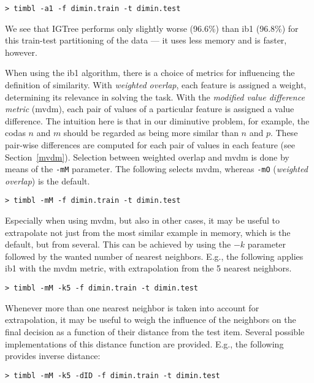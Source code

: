 \documentclass{book}
\begin{document}
{\footnotesize
\begin{verbatim}
> timbl -a1 -f dimin.train -t dimin.test
\end{verbatim}} 

We see that {\sc IGTree} performs only slightly worse (96.6\%) than
{\sc ib1} (96.8\%) for this train-test partitioning of the data --- it
uses less memory and is faster, however.

When using the {\sc ib1} algorithm, there is a choice of metrics for
influencing the definition of similarity. With {\em weighted overlap},
each feature is assigned a weight, determining its relevance in
solving the task. With the {\em modified value difference metric}
({\sc mvdm}), each pair of values of a particular feature is assigned
a value difference. The intuition here is that in our diminutive
problem, for example, the codas $n$ and $m$ should be regarded as
being more similar than $n$ and $p$. These pair-wise differences are
computed for each pair of values in each feature (see
Section~\ref{mvdm}). Selection between weighted overlap and {\sc mvdm}
is done by means of the {\tt -mM} parameter. The following selects {\sc
mvdm}, whereas {\tt -mO} ({\em weighted overlap}) is the default.

{\footnotesize
\begin{verbatim}
> timbl -mM -f dimin.train -t dimin.test
\end{verbatim}
}

Especially when using {\sc mvdm}, but also in other cases, it may be
useful to extrapolate not just from the most similar example in
memory, which is the default, but from several. This can be achieved
by using the $-k$ parameter followed by the wanted number of nearest
neighbors. E.g., the following applies {\sc ib1} with the {\sc mvdm}
metric, with extrapolation from the 5 nearest neighbors.

{\footnotesize
\begin{verbatim}
> timbl -mM -k5 -f dimin.train -t dimin.test
\end{verbatim}
}

Whenever more than one nearest neighbor is taken into account for
extrapolation, it may be useful to weigh the influence of the
neighbors on the final decision as a function of their distance from
the test item. Several possible implementations of this distance
function are provided. E.g., the following provides inverse distance: 

{\footnotesize
\begin{verbatim}
> timbl -mM -k5 -dID -f dimin.train -t dimin.test
\end{verbatim}
}
\end{document}

